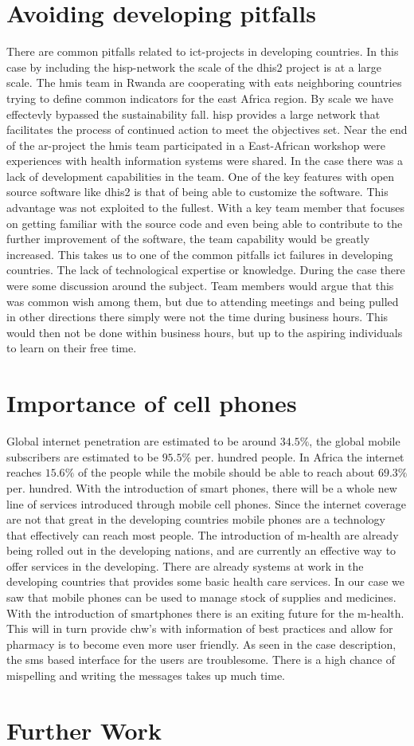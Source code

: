 \section{Avoiding developing pitfalls}
There are common pitfalls related to \gls{ict}-projects in developing countries. 
In this case by including the \gls{hisp}-network the scale of the \gls{dhis2} project is at a large scale. 
The \gls{hmis} team in Rwanda are cooperating with eats neighboring countries trying to define common indicators for the east Africa region.
By scale we have effectevly bypassed the sustainability fall. \gls{hisp} provides a large network that facilitates the process of continued action to meet the objectives set.
Near the end of the \gls{ar}-project the \gls{hmis} team participated in a East-African workshop were experiences with health information systems were shared.
In the case there was a lack of development capabilities in the team. 
One of the key features with open source software like \gls{dhis2} is that of being able to customize the software.
This advantage was not exploited to the fullest. 
With a key team member that focuses on getting familiar with the source code and even being able to contribute to the further improvement of the software, the team capability would be greatly increased. 
This takes us to one of the common pitfalls \gls{ict} failures in developing countries.
The lack of technological expertise or knowledge. 
During the case there were some discussion around the subject. 
Team members would argue that this was common wish among them, but due to attending meetings and being pulled in other directions there simply were not the time during business hours. 
This would then not be done within business hours, but up to the aspiring individuals to learn on their free time.

\section{Importance of cell phones}
Global internet penetration are estimated to be around $34.5\%$, the global mobile subscribers are estimated to be $95.5\%$ per. hundred people. 
In Africa the internet reaches $15.6\%$ of the people while the mobile should be able to reach about $69.3\%$ per. hundred.
With the introduction of smart phones, there will be a whole new line of services introduced through mobile cell phones.
Since the internet coverage are not that great in the developing countries mobile phones are a technology that effectively can reach most people. 
The introduction of m-health are already being rolled out in the developing nations, and are currently an effective way to offer services in the developing.
There are already systems at work in the developing countries that provides some basic health care services.
In our case we saw that mobile phones can be used to manage stock of supplies and medicines. 
With the introduction of smartphones there is an exiting future for the m-health. 
This will in turn provide \gls{chw}'s with information of best practices and allow for pharmacy \gls{is} to become even more user friendly.
As seen in the case description, the \gls{sms} based interface for the users are troublesome. 
There is a high chance of mispelling and writing the messages takes up much time. 


\cite{internet:stats}
\cite{mobile:think}
\section{Further Work}



